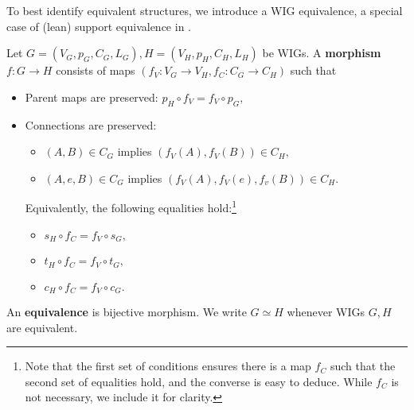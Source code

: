 
To best identify equivalent structures, we introduce a WIG equivalence, a special case of (lean) support equivalence in \cite{jensen-milner-bigraph}.
\begin{definition}
  Let $G = (V_{G}, p_{G}, C_{G}, L_{G}), H = (V_{H}, p_{H}, C_{H}, L_{H})$ be WIGs. A \textbf{morphism} $f: G \to H$ consists of maps $(f_{V}: V_{G} \to V_{H}, f_{C}: C_{G} \to C_{H})$ such that
  \begin{itemize}
    \item Parent maps are preserved: $p_{H} \circ f_{V} = f_{V} \circ p_{G},$
    \item Connections are preserved:
    \begin{itemize}
      \item $(A, B) \in C_{G}$ implies $(f_{V}(A), f_{V}(B)) \in C_{H},$
      \item $(A, e, B) \in C_{G}$ implies $(f_{V}(A), f_{V}(e), f_{v}(B)) \in C_{H}.$
    \end{itemize}
    Equivalently, the following equalities hold:\footnote{Note that the first set of conditions ensures there is a map $f_{C}$ such that the second set of equalities hold, and the converse is easy to deduce. While  $f_{C}$ is not necessary, we include it for clarity.}
    \begin{itemize}
      \item $s_{H} \circ f_{C} = f_{V} \circ s_{G},$
      \item $t_{H} \circ f_{C} = f_{V} \circ t_{G},$
      \item $c_{H} \circ f_{C} = f_{V} \circ c_{G}.$
    \end{itemize}
  \end{itemize}
  An \textbf{equivalence} is bijective morphism. We write $G \simeq H$ whenever WIGs $G, H$ are equivalent.
\end{definition}

